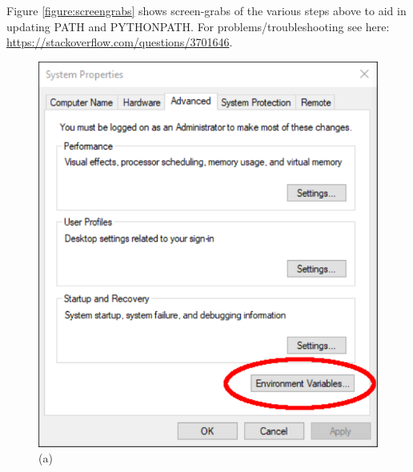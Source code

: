 \noindent Figure \ref{figure:screengrabs} shows screen-grabs of the various steps above to aid in updating PATH and PYTHONPATH.
\vspace{0.25cm}
\noindent For problems/troubleshooting see here: \url{https://stackoverflow.com/questions/3701646}.

\begin{figure}
\begin{center}
\begin{minipage}[t]{.29\textwidth}
\begin{center}
\includegraphics[width=\textwidth]{Figures/win/Win1.pdf}
(a)
\end{center}
\end{minipage}
\begin{minipage}[t]{.29\textwidth}
\begin{center}

\end{center}
\end{minipage}
\end{center}
\end{figure}

